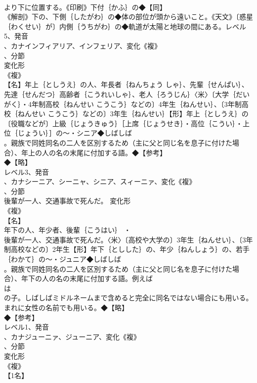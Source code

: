 \documentclass[8pt]{extreport}
\begin{document}
\begin{CJK}{UTF8}{min}
\\	より下に位置する。《印刷》下付｛かふ｝の◆【同】
\\	《解剖》下の、下側｛したがわ｝の◆体の部位が頭から遠いこと。《天文》〔惑星｛わくせい｝が〕内側｛うちがわ｝の◆軌道が太陽と地球の間にある。レベル5、発音
\\	、カナインフィアリア、インフェリア、変化《複》
\\	、分節
\\	変化形 
\\	《複》
\\	【名】年上｛としうえ｝の人、年長者｛ねんちょう しゃ｝、先輩｛せんぱい｝、先達｛せんだつ｝高齢者｛こうれいしゃ｝、老人｛ろうじん｝〈米〉〔大学｛だいがく｝・4年制高校｛ねんせい こうこう｝などの〕4年生｛ねんせい｝、〔3年制高校｛ねんせい こうこう｝などの〕3年生｛ねんせい｝【形】年上｛としうえ｝の〔役職などが〕上級｛じょうきゅう｝［上席｛じょうせき｝・高位｛こうい｝・上位｛じょうい｝］の～・シニア◆しばしば
\\	。親族で同姓同名の二人を区別するため（主に父と同じ名を息子に付けた場合）、年上の人の名の末尾に付加する語。◆【参考】
\\	◆【略】
\\	レベル3、発音
\\	、カナシーニア、シーニャ、シニア、スィーニァ、変化《複》
\\	、分節
\\	後輩が一人、交通事故で死んだ。	変化形 
\\	《複》
\\	【名】
\\	年下の人、年少者、後輩｛こうはい｝ ・
\\	後輩が一人、交通事故で死んだ。〈米〉〔高校や大学の〕3年生｛ねんせい｝、〔3年制高校などの〕2年生【形】年下｛としした｝の、年少｛ねんしょう｝の、若手｛わかて｝の～・ジュニア◆しばしば
\\	。親族で同姓同名の二人を区別するため（主に父と同じ名を息子に付けた場合）、年下の人の名の末尾に付加する語。例えば
\\	は
\\	の子。しばしばミドルネームまで含めると完全に同名ではない場合にも用いる。まれに女性の名前でも用いる。◆【略】
\\	◆【参考】
\\	レベル1、発音
\\	、カナジューニァ、ジューニア、変化《複》
\\	、分節
\\	変化形 
\\	《複》
\\	【1名】

\end{CJK}
\end{document}

